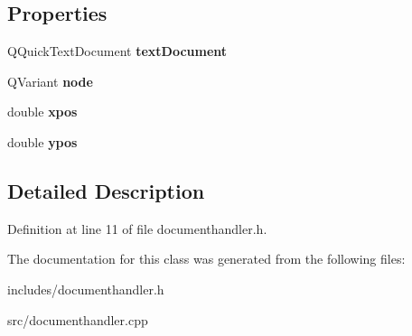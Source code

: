\subsection*{Properties}
\begin{DoxyCompactItemize}
\item 
\mbox{\label{classDocumentHandler_af2cc4935d7d4c0c358a9ce92402a2713}} 
Q\+Quick\+Text\+Document {\bfseries text\+Document}
\item 
\mbox{\label{classDocumentHandler_a76d9b652387d682951cccf452a76ea90}} 
Q\+Variant {\bfseries node}
\item 
\mbox{\label{classDocumentHandler_a0f3b97be34c7e4a3e47635ba65cddb9a}} 
double {\bfseries xpos}
\item 
\mbox{\label{classDocumentHandler_a3e7cfabf2b8c55e97572a19848e05b52}} 
double {\bfseries ypos}
\end{DoxyCompactItemize}


\subsection{Detailed Description}


Definition at line 11 of file documenthandler.\+h.



The documentation for this class was generated from the following files\+:\begin{DoxyCompactItemize}
\item 
includes/documenthandler.\+h\item 
src/documenthandler.\+cpp\end{DoxyCompactItemize}
